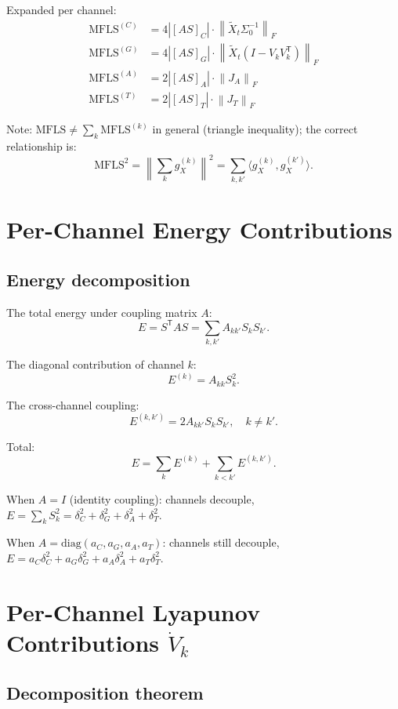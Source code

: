 \documentclass[11pt,a4paper]{article}
\theoremstyle{definition}
\newcommand{\T}{^{\mathsf{T}}}
\newcommand{\norm}[1]{\left\|#1\right\|}
\newcommand{\gX}{g_X}
\newcommand{\diag}{\mathrm{diag}}
\newcommand{\mfls}{\mathrm{MFLS}}
\begin{document}
Expanded per channel:
\begin{align*}
\mfls^{(C)} &= 4|[AS]_C|\cdot\norm{\tilde X_t\Sigma_0^{-1}}_F \\
\mfls^{(G)} &= 4|[AS]_G|\cdot\norm{\tilde X_t(I-V_kV_k\T)}_F \\
\mfls^{(A)} &= 2|[AS]_A|\cdot\norm{J_A}_F \\
\mfls^{(T)} &= 2|[AS]_T|\cdot\norm{J_T}_F
\end{align*}

Note: $\mfls \neq \sum_k\mfls^{(k)}$ in general (triangle inequality); the correct relationship is:
\[
\mfls^2 = \norm{\sum_k\gX^{(k)}}^2 = \sum_{k,k'}\langle\gX^{(k)},\gX^{(k')}\rangle.
\]

\section{Per-Channel Energy Contributions}

\subsection{Energy decomposition}

The total energy under coupling matrix $A$:
\[
E = S\T AS = \sum_{k,k'} A_{kk'}S_kS_{k'}.
\]

The diagonal contribution of channel $k$:
\[
E^{(k)} = A_{kk}S_k^2.
\]

The cross-channel coupling:
\[
E^{(k,k')} = 2A_{kk'}S_kS_{k'}, \quad k \neq k'.
\]

Total:
\[
E = \sum_k E^{(k)} + \sum_{k<k'}E^{(k,k')}.
\]

When $A = I$ (identity coupling): channels decouple,
$E = \sum_k S_k^2 = \delta_C^2 + \delta_G^2 + \delta_A^2 + \delta_T^2$.

When $A = \diag(a_C, a_G, a_A, a_T)$: channels still decouple,
$E = a_C\delta_C^2 + a_G\delta_G^2 + a_A\delta_A^2 + a_T\delta_T^2$.

\section{Per-Channel Lyapunov Contributions $\dot V_k$}

\subsection{Decomposition theorem}
\end{document}
